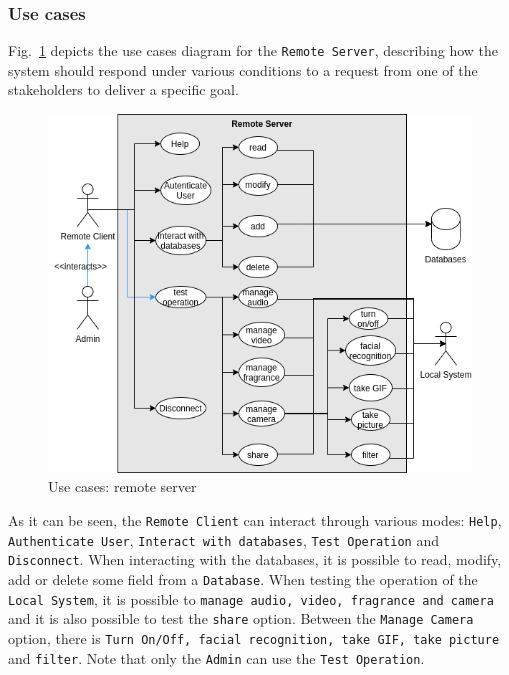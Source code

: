 \subsubsection{Use cases}
\label{sec:use-cases-2}

Fig.~\ref{fig:use-cases-rs} depicts the use cases diagram for the \texttt{Remote Server}, describing how the system should respond under various conditions to a request from one of the stakeholders to deliver a specific
goal.

\begin{figure}[htb!]
\centering
    \includegraphics[width=0.6\columnwidth]{./img/use-cases-rs.png}
  \caption{Use cases: remote server}%
\label{fig:use-cases-rs}
\end{figure}

As it can be seen, the \texttt{Remote Client} can interact through various modes: \texttt{Help}, \texttt{Authenticate User}, \texttt{Interact with databases}, \texttt{Test Operation} and \texttt{Disconnect}.
When interacting with the databases, it is possible to read, modify, add or delete some field from a \texttt{Database}.
When testing the operation of the \texttt{Local System}, it is possible to \texttt{manage audio, video, fragrance and camera} and it is also possible to test the \texttt{share} option.
Between the \texttt{Manage Camera} option, there is \texttt{Turn On/Off, facial recognition, take GIF, take picture} and \texttt{filter}.
Note that only the \texttt{Admin} can use the \texttt{Test Operation}.


